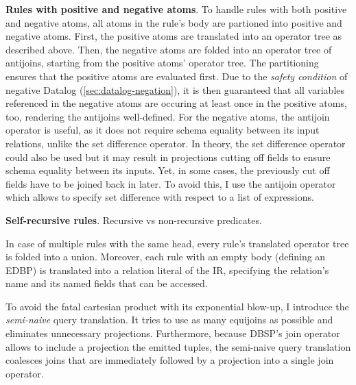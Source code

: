 \textbf{Rules with positive and negative atoms}.
To handle rules with both positive and negative atoms,
all atoms in the rule's body are partioned into positive and negative atoms.
First, the positive atoms are translated into an operator tree as described above.
Then, the negative atoms are folded into an operator tree of antijoins,
starting from the positive atoms' operator tree.
The partitioning ensures that the positive atoms are evaluated first.
Due to the \emph{safety condition} of negative Datalog (\ref{sec:datalog-negation}),
it is then guaranteed that all variables referenced in the negative atoms are
occuring at least once in the positive atoms, too, rendering the antijoins well-defined.
For the negative atoms, the antijoin operator is useful, as it does not
require schema equality between its input relations, unlike the set difference operator.
In theory, the set difference operator could also be used but it may result
in projections cutting off fields to ensure schema equality between its inputs.
Yet, in some cases, the previously cut off fields have to be joined back in later.
To avoid this, I use the antijoin operator which allows to specify set difference
with respect to a list of expressions.

\textbf{Self-recursive rules}.
Recursive vs non-recursive predicates.

In case of multiple rules with the same head,
every rule's translated operator tree is folded into a union.
Moreover, each rule with an empty body (defining an \ac{EDBP})
is translated into a relation literal of the \ac{IR}, specifying
the relation's name and its named fields that can be accessed.

To avoid the fatal cartesian product with its exponential blow-up,
I introduce the \emph{semi-naive} query translation.
It tries to use as many equijoins as possible and eliminates unnecessary projections.
Furthermore, because DBSP's join operator allows to include a projection the
emitted tuples,
the semi-naive query translation coalesces joins that are immediately followed
by a projection into a single join operator.








